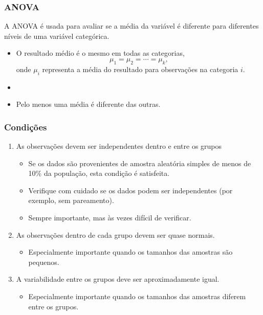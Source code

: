 
\begin{frame}
\frametitle{ANOVA}
\justifying
A ANOVA é usada para avaliar se a média da variável é diferente para diferentes níveis de uma variável categórica.

\pause

\begin{itemize}
\justifying
\item[]  O resultado médio é o mesmo em todas as categorias, 
\[\mu_1 = \mu_2 = \cdots = \mu_k, \]
\justifying
onde $\mu_i$ representa a média do resultado para observações na categoria $i$.
\item[]
\justifying
\item[]  Pelo menos uma média é diferente das outras.
\end{itemize}

\end{frame}


\begin{frame}
\small
\frametitle{Condições}

\begin{enumerate}
\justifying
\item As observações devem ser independentes dentro e entre os grupos

\begin{itemize}
\justifying
\item Se os dados são provenientes de amostra aleatória simples de menos de 10\% da população, esta condição é satisfeita.
\justifying
\item Verifique com cuidado se os dados podem ser independentes (por exemplo, sem pareamento).
\justifying
\item Sempre importante, mas às vezes difícil de verificar.
\end{itemize}

\pause
\justifying
\item As observações dentro de cada grupo devem ser quase normais.

\begin{itemize}
\justifying
\item Especialmente importante quando os tamanhos das amostras são pequenos.
\end{itemize}
\justifying
{}

\pause
\justifying
\item A variabilidade entre os grupos deve ser aproximadamente igual.

\begin{itemize}
\justifying
\item Especialmente importante quando os tamanhos das amostras diferem entre os grupos.
\end{itemize}
\justifying
{}

\end{enumerate}
\end{frame}



